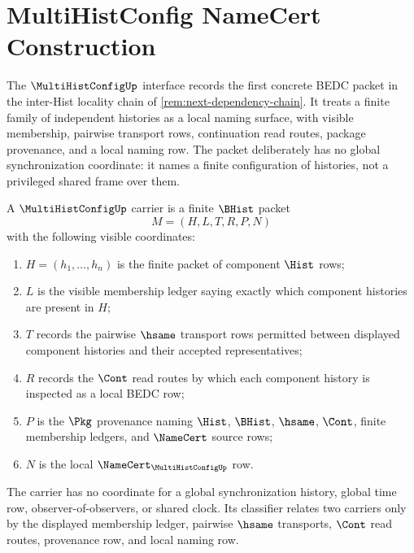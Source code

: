 \chapter{MultiHistConfig NameCert Construction}
\label{ch:concrete-instances-multihistconfig-namecert}

The $\MultiHistConfigUp$ interface records the first concrete BEDC packet in the inter-Hist locality chain of \autoref{rem:next-dependency-chain}. It treats a finite family of independent histories as a local naming surface, with visible membership, pairwise transport rows, continuation read routes, package provenance, and a local naming row. The packet deliberately has no global synchronization coordinate: it names a finite configuration of histories, not a privileged shared frame over them.

\begin{definition}
\label{def:multi-hist-config-carrier}
A $\MultiHistConfigUp$ carrier is a finite $\BHist$ packet
$$
M=(H,L,T,R,P,N)
$$
with the following visible coordinates:
\begin{enumerate}
\item $H=(h_1,\ldots,h_n)$ is the finite packet of component $\Hist$ rows;
\item $L$ is the visible membership ledger saying exactly which component histories are present in $H$;
\item $T$ records the pairwise $\hsame$ transport rows permitted between displayed component histories and their accepted representatives;
\item $R$ records the $\Cont$ read routes by which each component history is inspected as a local BEDC row;
\item $P$ is the $\Pkg$ provenance naming $\Hist$, $\BHist$, $\hsame$, $\Cont$, finite membership ledgers, and $\NameCert$ source rows;
\item $N$ is the local $\NameCert_{\MultiHistConfigUp}$ row.
\end{enumerate}
The carrier has no coordinate for a global synchronization history, global time row, observer-of-observers, or shared clock. Its classifier relates two carriers only by the displayed membership ledger, pairwise $\hsame$ transports, $\Cont$ read routes, provenance row, and local naming row.
\end{definition}

